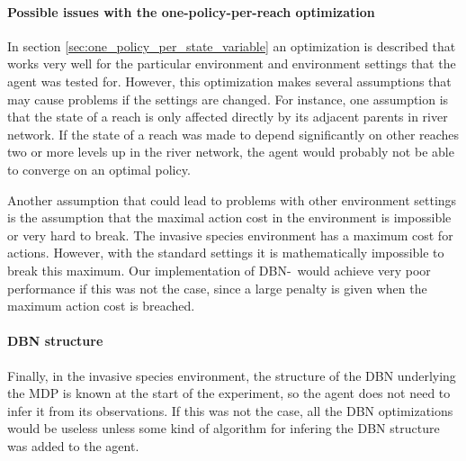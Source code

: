 \paragraph{Possible issues with the one-policy-per-reach optimization} In section \ref{sec:one_policy_per_state_variable} an optimization is described that works very well for the particular environment and environment settings that the agent was tested for. However, this optimization makes several assumptions that may cause problems if the settings are changed. For instance, one assumption is that the state of a reach is only affected directly by its adjacent parents in river network. If the state of a reach was made to depend significantly on other reaches two or more levels up in the river network, the agent would probably not be able to converge on an optimal policy. 

Another assumption that could lead to problems with other environment settings is the assumption that the maximal action cost in the environment is impossible or very hard to break. The invasive species environment has a maximum cost for actions. However, with the standard settings it is mathematically impossible to break this maximum. Our implementation of DBN-\etre\ would achieve very poor performance if this was not the case, since a large penalty is given when the maximum action cost is breached. 

\paragraph{DBN structure} Finally, in the invasive species environment, the structure of the DBN underlying the MDP is known at the start of the experiment, so the agent does not need to infer it from its observations. If this was not the case, all the DBN optimizations would be useless unless some kind of algorithm for infering the DBN structure was added to the agent. 
